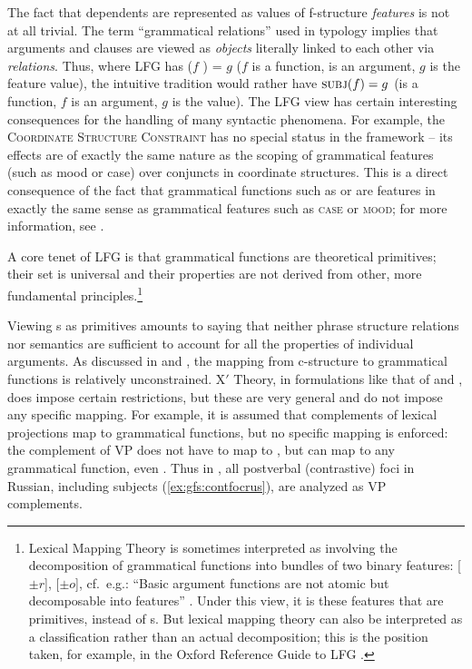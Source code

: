 \documentclass[output=paper]{../langscibook}
\begin{document}
 The fact that dependents are represented as values of f-structure \textit{features} is not at all trivial. The term ``grammatical relations'' used in typology implies that arguments and clauses are viewed as \textit{objects} literally linked to each other via \textit{relations}. Thus, where LFG has ($f$ \SUBJ) = $g$ ($f$ is a function, \SUBJ is an argument, $g$ is the feature value), the intuitive tradition would rather have $\textsc{subj}{}(f) = g$ (\SUBJ is a function, $f$ is an argument, $g$ is the value). The LFG view has certain interesting consequences for the handling of many syntactic phenomena. For example, the \textsc{Coordinate Structure Constraint} \citep{ross1967constraints} has no special status in the framework -- its effects are of exactly the same nature as the scoping of grammatical features (such as mood or case) over conjuncts in coordinate structures. This is a direct consequence of the fact that grammatical functions such as \SUBJ or \OBJ are features in exactly the same sense as grammatical features such as \textsc{case} or \textsc{mood}; for more information, see .
 
 A core tenet of LFG is that grammatical functions are theoretical primitives; their set is universal and their properties are not derived from other, more fundamental principles.\footnote{Lexical Mapping Theory \citep{bresnan1989locative} is sometimes interpreted as involving the decomposition of grammatical functions into bundles of two binary features: [$\pm{r}$], [$\pm{o}$], cf.\ e.g.: ``Basic argument functions are not atomic but decomposable into features'' \citep{kibort14}. Under this view, it is these features that are primitives, instead of {\GF}s. But lexical mapping theory can also be interpreted as a classification rather than an actual decomposition; this is the position taken, for example, in the Oxford Reference Guide to LFG \citep{DLM:LFG}.}
 
 Viewing {\GF}s as primitives amounts to saying that neither phrase structure relations nor semantics are sufficient to account for all the properties of individual arguments. As discussed in  and , the mapping from c-structure to grammatical functions is relatively unconstrained. X$'${} Theory, in formulations like that of \citet{bresnan2001lexical} and \citet{BresnanEtAl2016}, does impose certain restrictions, but these are very general and do not impose any specific mapping. For example, it is assumed that complements of lexical projections map to grammatical functions, but no specific mapping is enforced: the complement of VP does not have to map to \OBJ, but can map to any grammatical function, even \SUBJ. Thus in \citet{King95}, all postverbal (contrastive) foci in Russian, including subjects (\ref{ex:gfs:contfocrus}), are analyzed as VP complements.
 
\end{document}
